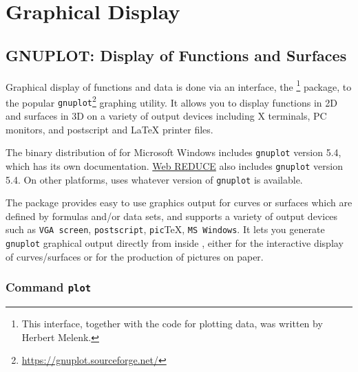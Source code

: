 \chapter{Graphical Display}


\section{GNUPLOT: Display of Functions and Surfaces}
\label{package:GNUPLOT}
\newcommand{\Gnuplot}{\texttt{gnuplot}}

Graphical display of functions and data is done via an interface, the
{\REDUCE} \footnote{This interface, together with the
code for plotting data, was written by Herbert Melenk.} package, to
the popular
{\Gnuplot}\footnote{\url{https://gnuplot.sourceforge.net/}} graphing
utility.  It allows you to display functions in 2D and surfaces in 3D
on a variety of output devices including X terminals, PC monitors, and
postscript and {\LaTeX} printer files.

The binary distribution of {\REDUCE} for Microsoft Windows includes
{\Gnuplot} version 5.4, which has its own documentation.
\href{https://reduce-algebra.sourceforge.io/web-reduce/about.php?start}{Web
REDUCE} also includes {\Gnuplot} version 5.4.  On other platforms,
{\REDUCE} uses whatever version of {\Gnuplot} is available.

The  package provides easy to use graphics output for
curves or surfaces which are defined by formulas and/or data sets, and
supports a variety of output devices such as \texttt{VGA screen},
\texttt{postscript}, \texttt{pic}\TeX, \texttt{MS Windows}.  It lets
you generate {\Gnuplot} graphical output directly from inside
{\REDUCE}, either for the interactive display of curves/surfaces or
for the production of pictures on paper.

\subsection{Command \texttt{plot}}
\hypertarget{command:PLOT}{}

